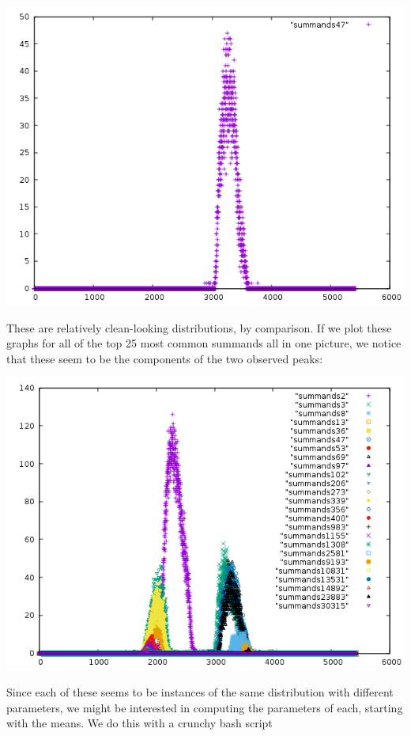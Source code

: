 \documentclass{article}
\theoremstyle{definition}
\theoremstyle{remark}
\numberwithin{equation}{section}
\begin{document}
{\includegraphics[scale=0.5]{../figs/summands47.png}

These are relatively clean-looking distributions, by comparison.  If
we plot these graphs for all of the top 25 most common summands all in
one picture, we notice that these seem to be the components of the two
observed peaks:

\includegraphics[scale=0.5]{../figs/summands_mod_5422.png}

Since each of these seems to be instances of the same distribution
with different parameters, we might be interested in computing the
parameters of each, starting with the means.  We do this with a crunchy bash script




}
\end{document}
